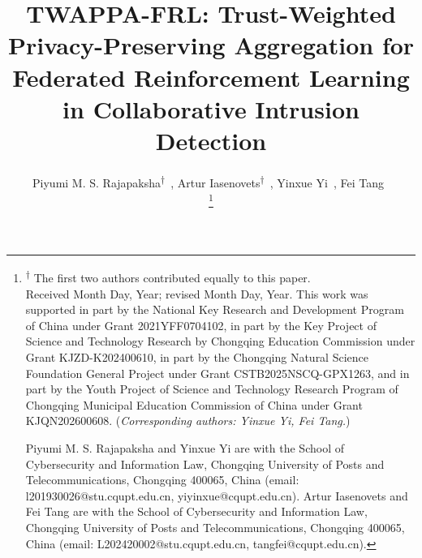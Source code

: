 \documentclass[journal]{IEEEtran}
\begin{document}
\title{TWAPPA-FRL: Trust-Weighted Privacy-Preserving Aggregation for Federated Reinforcement Learning
in Collaborative Intrusion Detection}

\author{Piyumi M. S. Rajapaksha\textsuperscript{$\dagger$}~, 
Artur Iasenovets\textsuperscript{$\dagger$}~, 
Yinxue Yi~,
Fei Tang~

\thanks{\textsuperscript{$\dagger$} The first two authors contributed equally to this paper.\\
Received Month Day, Year; revised Month Day, Year. This work was supported in 
part by the National Key Research and Development Program of China under Grant 2021YFF0704102, 
in part by the Key Project of Science and Technology Research by Chongqing Education Commission 
under Grant KJZD-K202400610, in part by the Chongqing Natural Science Foundation General 
Project under Grant CSTB2025NSCQ-GPX1263, and in part by the Youth Project of Science and 
Technology Research Program of Chongqing Municipal Education Commission of China under Grant KJQN202600608.
(\emph{Corresponding authors: Yinxue Yi, Fei Tang.})

Piyumi M. S. Rajapaksha and Yinxue Yi are with the School of Cybersecurity and Information Law, 
Chongqing University of Posts and Telecommunications, Chongqing 400065, China 
(email:  l201930026@stu.cqupt.edu.cn, yiyinxue@cqupt.edu.cn).
Artur Iasenovets and Fei Tang are with the School of Cybersecurity and Information Law, 
Chongqing University of Posts and Telecommunications, Chongqing 400065, China 
(email: L202420002@stu.cqupt.edu.cn, tangfei@cqupt.edu.cn).
}}

\maketitle
\end{document}
